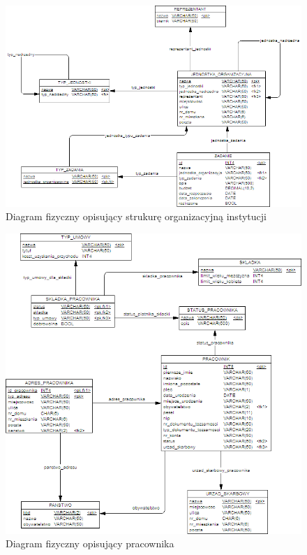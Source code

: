 \begin{figure}[tdh]
    \begin{center}
	\includegraphics[scale=.8]{img/fizyczny1.png}
	\caption{Diagram fizyczny opisujący strukurę organizacyjną instytucji}
	\label{fizyczny1}
    \end{center}
\end{figure}
\begin{figure}[tdh]
    \begin{center}
	\includegraphics[scale=.8]{img/fizyczny2.png}
	\caption{Diagram fizyczny opisujący pracownika}
	\label{fizyczny2}
    \end{center}
\end{figure}
